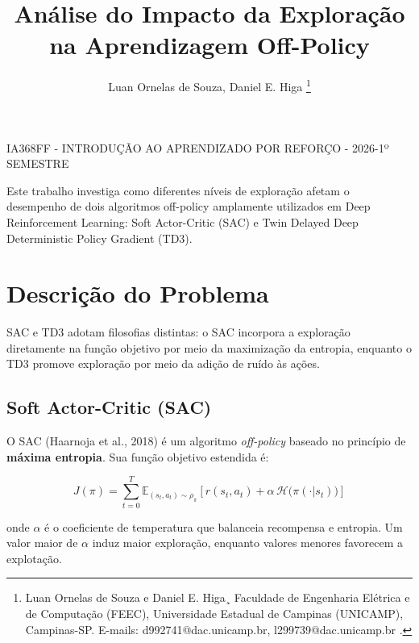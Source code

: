 \documentclass{Supervised_Reinforcement_Learningqsport}
\begin{document}
\title{Análise do Impacto da Exploração na Aprendizagem Off-Policy}

\author{Luan Ornelas de Souza, Daniel E. Higa
\thanks{Luan Ornelas de Souza e Daniel E. Higa¸
Faculdade de Engenharia Elétrica e de Computação (FEEC), Universidade Estadual de Campinas (UNICAMP), Campinas-SP. E-mails: d992741@dac.unicamp.br,
l299739@dac.unicamp.br .}}

\maketitle

 {IA368FF - INTRODUÇÃO AO APRENDIZADO POR REFORÇO - 2026-1º SEMESTRE}

\begin{resumo}
Este trabalho investiga como diferentes níveis de exploração afetam o desempenho de dois algoritmos off-policy amplamente utilizados em Deep Reinforcement Learning: Soft Actor-Critic (SAC) e Twin Delayed Deep Deterministic Policy Gradient (TD3).

\end{resumo}

\section{Descrição do Problema}

SAC e TD3 adotam filosofias distintas: o SAC incorpora a exploração diretamente na função objetivo por meio da maximização da entropia, enquanto o TD3 promove exploração por meio da adição de ruído às ações.

\subsection{Soft Actor-Critic (SAC)}

O SAC (Haarnoja et al., 2018) é um algoritmo \textit{off-policy} baseado no princípio de \textbf{máxima entropia}. Sua função objetivo estendida é:

\begin{equation}
J(\pi) = \sum_{t=0}^{T} \mathbb{E}_{(s_t,a_t)\sim\rho_{\pi}}
\left[
r(s_t,a_t) + \alpha \, \mathcal{H}\bigl(\pi(\cdot|s_t)\bigr)
\right]
\end{equation}

onde $\alpha$ é o coeficiente de temperatura que balanceia recompensa e entropia. Um valor maior de $\alpha$ induz maior exploração, enquanto valores menores favorecem a explotação.
\end{document}
